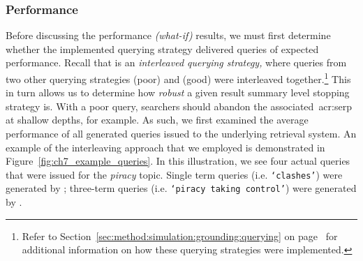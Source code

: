 \subsubsection{Performance}\label{sec:snippets:simulations:results:perf}
Before discussing the performance \emph{(what-if)} results, we must first determine whether the implemented querying strategy  delivered queries of expected performance. Recall that  is an \emph{interleaved querying strategy,} where queries from two other querying strategies  (poor) and  (good) were interleaved together.\footnote{Refer to Section~\ref{sec:method:simulation:grounding:querying} on page~\pageref{sec:method:simulation:grounding:querying} for additional information on how these querying strategies were implemented.} This in turn allows us to determine how \emph{robust} a given result summary level stopping strategy is. With a poor query, searchers should abandon the associated~\gls{acr:serp} at shallow depths, for example. As such, we first examined the average performance of all generated queries issued to the underlying retrieval system. An example of the interleaving approach that we employed is demonstrated in Figure~\ref{fig:ch7_example_queries}. In this illustration, we see four actual queries that were issued for the \emph{piracy} topic. Single term queries (i.e. \texttt{`clashes'}) were generated by ; three-term queries (i.e. \texttt{`piracy taking control'}) were generated by .

